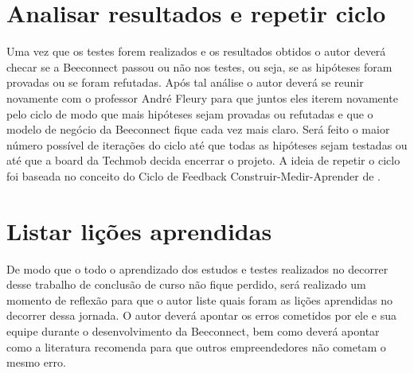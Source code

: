 \section{Analisar resultados e repetir ciclo}
\label{cha:analisar_resultados}
Uma vez que os testes forem realizados e os resultados obtidos o autor deverá checar se a Beeconnect passou ou não nos testes, ou seja, se as hipóteses foram provadas ou se foram refutadas. 
Após tal análise o autor deverá se reunir novamente com o professor André Fleury para que juntos eles iterem novamente pelo ciclo de modo que mais hipóteses sejam provadas ou refutadas e que o modelo de negócio da Beeconnect fique cada vez mais claro. Será feito o maior número possível de iterações do ciclo até que todas as hipóteses sejam testadas ou até que a board da Techmob decida encerrar o projeto. A ideia de repetir o ciclo foi baseada no conceito do Ciclo de Feedback Construir-Medir-Aprender de .

\section{Listar lições aprendidas}
\label{cha:listar_licoes_aprendidas}
De modo que o todo o aprendizado dos estudos e testes realizados no decorrer desse trabalho de conclusão de curso não fique perdido, será realizado um momento de reflexão para que o autor liste quais foram as lições aprendidas no decorrer dessa jornada. O autor deverá apontar os erros cometidos por ele e sua equipe durante o desenvolvimento da Beeconnect, bem como deverá apontar como a literatura recomenda para que outros empreendedores não cometam o mesmo erro.